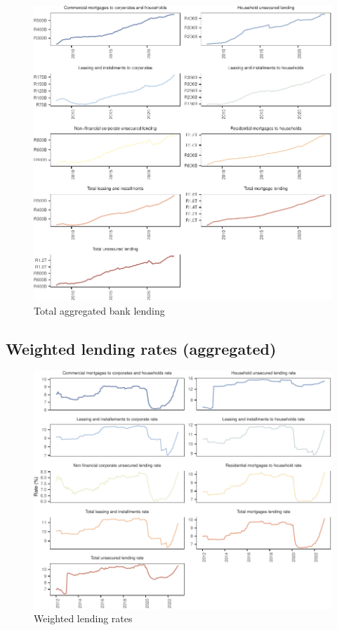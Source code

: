 \documentclass[
  letterpaper,
  DIV=11,
  numbers=noendperiod]{scrartcl}
\begin{document}
\begin{figure}[H]

{\centering \includegraphics{UP_Paper_files/figure-pdf/fig-bank_lending-1.pdf}

}

\caption{\label{fig-bank_lending}Total aggregated bank lending}

\end{figure}

\hypertarget{weighted-lending-rates-aggregated}{%
\subsection{Weighted lending rates
(aggregated)}\label{weighted-lending-rates-aggregated}}

\begin{figure}[H]

{\centering \includegraphics{UP_Paper_files/figure-pdf/fig-bank_interest_rates-1.pdf}

}

\caption{\label{fig-bank_interest_rates}Weighted lending rates}

\end{figure}
\end{document}
